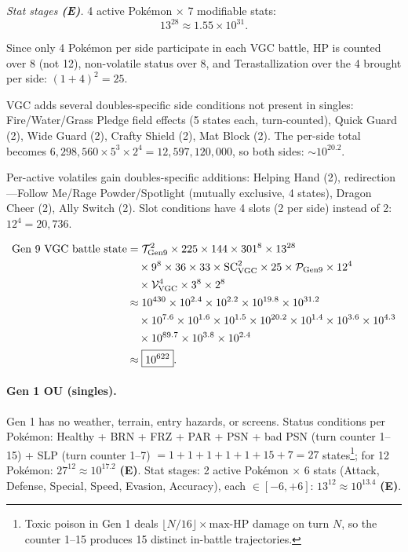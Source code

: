 \emph{Stat stages \textbf{(E)}.}
4 active Pokémon × 7 modifiable stats:
\begin{equation}
    13^{28} \approx 1.55 \times 10^{31}.
\end{equation}


Since only 4 Pok\'emon per side participate in each VGC battle, HP is counted over 8 (not 12), non-volatile status over 8, and Terastallization over the 4 brought per side: $(1+4)^2 = 25$.

VGC adds several doubles-specific side conditions not present in singles:
Fire/Water/Grass Pledge field effects (5 states each, turn-counted),
Quick Guard (2), Wide Guard (2), Crafty Shield (2), Mat Block (2).
The per-side total becomes $6{,}298{,}560 \times 5^3 \times 2^4 = 12{,}597{,}120{,}000$, so both sides: $\sim 10^{20.2}$.

Per-active volatiles gain doubles-specific additions:
Helping Hand (2), redirection---Follow Me/Rage Powder/Spotlight (mutually exclusive, 4 states), Dragon Cheer (2), Ally Switch (2).
Slot conditions have 4 slots (2 per side) instead of 2: $12^4 = 20{,}736$.

\begin{align}
    \text{Gen 9 VGC battle state}
    &= \mathcal{T}_{\text{Gen9}}^2 \times 225 \times 144 \times 301^{8} \times 13^{28} \notag \\
    &\quad \times 9^{8} \times 36 \times 33 \times \text{SC}_{\text{VGC}}^2 \times 25 \times \mathcal{P}_{\text{Gen9}} \times 12^4 \notag \\
    &\quad \times \mathcal{V}_{\text{VGC}}^{4} \times 3^{8} \times 2^{8} \notag \\
    &\approx 10^{430} \times 10^{2.4} \times 10^{2.2} \times 10^{19.8} \times 10^{31.2} \notag \\
    &\quad \times 10^{7.6} \times 10^{1.6} \times 10^{1.5} \times 10^{20.2} \times 10^{1.4} \times 10^{3.6} \times 10^{4.3} \notag \\
    &\quad \times 10^{89.7} \times 10^{3.8} \times 10^{2.4} \notag \\
    &\approx \boxed{10^{622}}.
    \label{eq:gen9-vgc-battle}
\end{align}

\paragraph{Gen 1 OU (singles).}

Gen 1 has no weather, terrain, entry hazards, or screens.
Status conditions per Pokémon: Healthy + BRN + FRZ + PAR + PSN + bad PSN (turn counter 1--15) + SLP (turn counter 1--7) $= 1+1+1+1+1+15+7 = 27$ states\footnote{Toxic poison in Gen 1 deals $\lfloor N/16 \rfloor \times \text{max-HP}$ damage on turn $N$, so the counter 1--15 produces 15 distinct in-battle trajectories.}; for 12 Pokémon: $27^{12} \approx 10^{17.2}$ \textbf{(E)}.
Stat stages: 2 active Pokémon × 6 stats (Attack, Defense, Special, Speed, Evasion, Accuracy), each $\in [-6,+6]$: $13^{12} \approx 10^{13.4}$ \textbf{(E)}.

